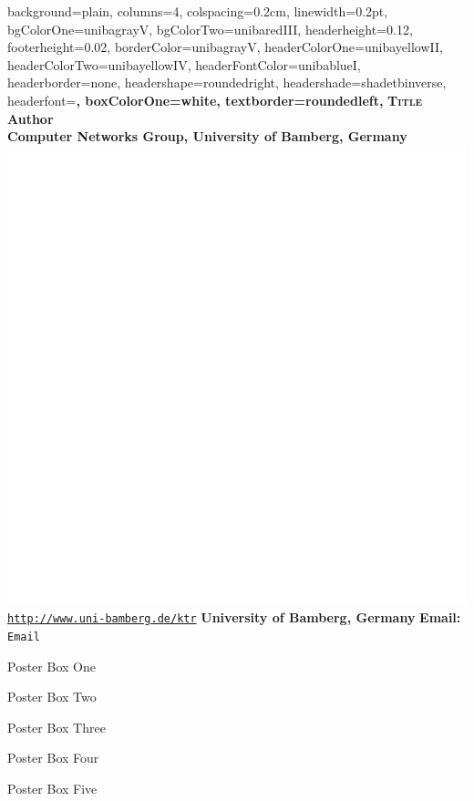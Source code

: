\documentclass[a0paper,
landscape,
fontscale=0.332,
debug,
hyperref={pdfpagelabels=false}]{baposter}
\begin{document}
\begin{poster}{
  background=plain,%
  columns=4,
  colspacing=0.2cm,
  linewidth=0.2pt,
  bgColorOne=unibagrayV,
  bgColorTwo=unibaredIII,
  headerheight=0.12\textheight,
  footerheight=0.02\textheight,
  borderColor=unibagrayV,
  headerColorOne=unibayellowII,
  headerColorTwo=unibayellowIV,
  headerFontColor=unibablueI,
  headerborder=none,
  headershape=roundedright,
  headershade=shadetbinverse,%
  headerfont=\large\bf,
  boxColorOne=white,
  textborder=roundedleft,
}
{}
 {\Huge\textcolor{unibayellowI}{\textbf{\textsc{Title}}}\normalsize}
 {\LARGE\textcolor{unibagrayV}{\textbf{Author}}\normalsize\\[.5em]
 {\Large\textcolor{unibagrayIV}{\textbf{Computer Networks Group, University of Bamberg, Germany}}\normalsize}}
{\includegraphics[width=.07\linewidth]{images/logow}}
{\textcolor{unibablueI}{\texttt{\url{http://www.uni-bamberg.de/ktr}}}}
{\textcolor{unibablueI}{\textbf{University of Bamberg, Germany}}}
{\textcolor{unibablueI}{\textbf{Email:} \texttt{Email}}}


\begin{posterbox}[column=0, name=posterboxOne, height=auto]{Poster Box One}

\end{posterbox}

\begin{posterbox}[column=1, span=2,height=auto, name=posterboxTwo, boxpadding=1em]{Poster Box Two}

\end{posterbox}

\begin{posterbox}[column=0,span=2,below=auto,height=bottom, name=posterboxThree]{Poster Box Three}

\end{posterbox}

\begin{posterbox}[column=2,below=posterboxTwo, height=auto, name=posterboxFour]{Poster Box Four}

\end{posterbox}

\begin{posterbox}[column=2, height=bottom, below=posterboxFour, name=posterboxFive]{Poster Box Five}


\end{posterbox}
\end{poster}
\end{document}
